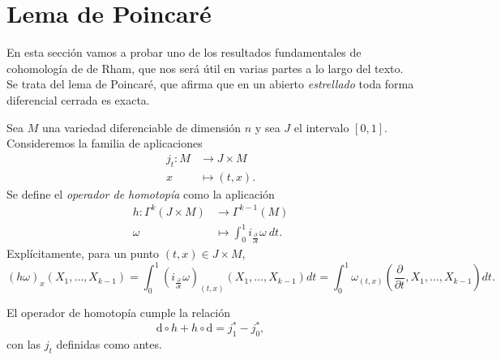   \section{Lema de Poincaré}
  En esta sección vamos a probar uno de los resultados fundamentales de cohomología de de Rham, que nos será útil en varias partes a lo largo del texto. Se trata del lema de Poincaré, que afirma que en un abierto \emph{estrellado} toda forma diferencial cerrada es exacta.

  Sea $M$ una variedad diferenciable de dimensión $n$ y sea $J$ el intervalo $[0,1]$. Consideremos la familia de aplicaciones
\begin{align*}
  j_t :M&\longrightarrow J\times M\\ 
    x &\longmapsto (t,x). 
  \end{align*}
  Se define el \emph{operador de homotopía} como la aplicación
  \begin{align*}
    h :\Gamma^k(J\times M)&\longrightarrow \Gamma^{k-1}(M)\\ 
    \omega &\longmapsto \int_{0}^1 i_{\frac{\partial}{\partial t}}\omega\ dt. 
    \end{align*}
    Explícitamente, para un punto $(t,x)\in J\times M$,
    \begin{equation*}
      (h\omega)_{x }(X_1,\dots,X_{k-1})=\int_{0}^1 (i_{\frac{\partial}{\partial t}}\omega)_{(t,x)}(X_1,\dots,X_{k-1}) dt=\int_{0}^1 \omega_{(t,x)}\left(\frac{\partial}{\partial t},X_1,\dots,X_{k-1}\right) dt.
    \end{equation*}

    \begin{center}
    \end{center}

    \begin{prop}
      El operador de homotopía cumple la relación
      \begin{equation*}
	\mathrm{d} \circ h + h \circ \mathrm{d} = j_1^* - j_0^*,
      \end{equation*}
      con las $j_t$ definidas como antes.
    \end{prop}
    
